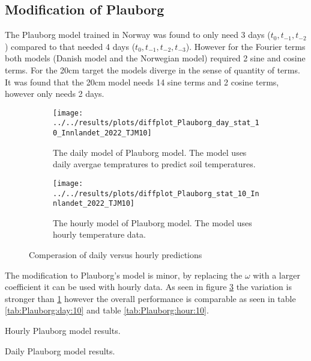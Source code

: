 \subsection{Modification of Plauborg}

The Plauborg model trained in Norway was found to only need 3 days ($t_0,t_{-1},t_{-2}$) compared to \cite{plauborg_simple_2002} that needed 4 days ($t_0,t_{-1},t_{-2},t_{-3}$). However for the Fourier terms both models (Danish model and the Norwegian model) required 2 sine and cosine terms. For the 20cm target the models diverge in the sense of quantity of terms. It was found that the 20cm model needs 14 sine terms and 2 cosine terms, however only needs 2 days.
\begin{figure}[H]
	\begin{subfigure}{\textwidth}
		\centering
		\texttt{[image: ../../results/plots/diffplot\_Plauborg\_day\_stat\_10\_Innlandet\_2022\_TJM10]}
		\caption[Plauborg daily TJM10]{The daily model of Plauborg model. The model uses daily avergae tempratures to predict soil temperatures.}
		\label{fig:diffplotplauborgdaystat10innlandet2022tjm10}
	\end{subfigure}
	\begin{subfigure}{\textwidth}
		\centering
		\texttt{[image: ../../results/plots/diffplot\_Plauborg\_stat\_10\_Innlandet\_2022\_TJM10]}
		\caption[Plauborg hourly TJM10]{The hourly model of Plauborg model. The model uses hourly temperature data.}
		\label{fig:diffplotplauborgstat10innlandet2022tjm10}
	\end{subfigure}
	\caption{Comperasion of daily versus hourly predictions}
\end{figure}

The modification to Plauborg's model is minor, by replacing the $\omega$ with a larger coefficient it can be used with hourly data. As seen in figure \ref{fig:diffplotplauborgstat10innlandet2022tjm10} the variation is stronger than \ref{fig:diffplotplauborgdaystat10innlandet2022tjm10} however the overall performance is comparable as seen in table \ref{tab:Plauborg:day:10} and table \ref{tab:Plauborg:hour:10}. 

\begin{table}[t]
	\centering
	\resizebox{\textwidth}{!}{
		
	}
	\caption{Hourly Plauborg model results.}
	\label{tab:plauborg_hour_res}
\end{table}

\begin{table}[t]
	\centering
	\resizebox{\textwidth}{!}{
		
	}
	\caption{Daily Plauborg model results.}
	\label{tab:plauborg_day_res}
\end{table}

